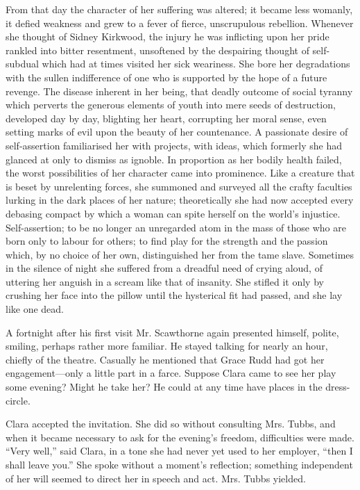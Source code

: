 From that day the character of her suffering was altered; it became less
womanly, it defied weakness and grew to a fever of fierce, unscrupulous
rebellion. Whenever she thought of Sidney Kirkwood, the injury he was
inflicting upon her pride rankled into bitter resentment, unsoftened by
the despairing thought of self- subdual which had at times visited her
sick weariness. She bore her degradations with the sullen indifference
of one who is supported by the hope of a future revenge. The disease
inherent in her being, that deadly outcome of social tyranny which
perverts the generous elements of youth into mere seeds of destruction,
developed day by day, blighting her heart, corrupting her moral sense,
even {\protect\hypertarget{209}{}{}}setting marks of evil upon the
beauty of her countenance. A passionate desire of self-assertion
familiarised her with projects, with ideas, which formerly she had
glanced at only to dismiss as ignoble. In proportion as her bodily
health failed, the worst possibilities of her character came into
prominence. Like a creature that is beset by unrelenting forces, she
summoned and surveyed all the crafty faculties lurking in the dark
places of her nature; theoretically she had now accepted every debasing
compact by which a woman can spite herself on the world's injustice.
Self-assertion; to be no longer an unregarded atom in the mass of those
who are born only to labour for others; to find play for the strength
and the passion which, by no choice of her own, distinguished her from
the tame slave. Sometimes in the silence of night she suffered from a
dreadful need of crying aloud, of uttering her anguish in a scream like
that of insanity. She stifled it only by crushing her face into the
pillow until the hysterical fit had passed, and she lay like one dead.

{\protect\hypertarget{210}{}{}}A fortnight after his first visit Mr.
Scawthorne again presented himself, polite, smiling, perhaps rather more
familiar. He stayed talking for nearly an hour, chiefly of the theatre.
Casually he mentioned that Grace Rudd had got her engagement---only a
little part in a farce. Suppose Clara came to see her play some evening?
Might he take her? He could at any time have places in the dress-circle.

Clara accepted the invitation. She did so without consulting Mrs. Tubbs,
and when it became necessary to ask for the evening's freedom,
difficulties were made. ``Very well,'' said Clara, in a tone she had
never yet used to her employer, ``then I shall leave you.'' She spoke
without a moment's reflection; something independent of her will seemed
to direct her in speech and act. Mrs. Tubbs yielded.

